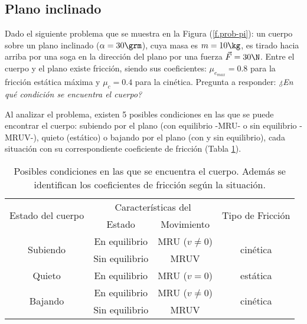 \subsection{Plano inclinado}
\label{c.pi}

Dado el siguiente problema que se muestra en la Figura (\ref{f.prob-pi}): un cuerpo
sobre un plano inclinado ($\alpha=30\grm$), cuya masa es $m=10\kg$, es tirado hacia
arriba por una soga en la dirección del plano por una fuerza $\vec{F}=30\N$.
Entre el cuerpo y el plano existe fricción, siendo sus coeficientes:
$\mu_{e_{max}}=0.8$ para la fricción estática máxima y $\mu_{c}=0.4$ para la
cinética. Pregunta a responder: \emph{¿En qué condición se encuentra el cuerpo?}

\begin{figure}[!ht]
  
\end{figure}

Al analizar el problema, existen 5 posibles condiciones en las que se puede
encontrar el cuerpo: subiendo por el plano (con equilibrio -MRU- o sin
equilibrio -MRUV-), quieto (estático) o bajando por el plano (con y sin
equilibrio), cada situación con su correspondiente coeficiente de fricción
(Tabla \ref{t.condicionpi}).

\begin{table}[!ht]
  \centering
\begin{tabular}{c|c|c|c}
  \hline\hline
  \multirow{2}{*}{Estado del cuerpo} & \multicolumn{2}{|c|}{Características del}
  & \multirow{2}{*}{Tipo de Fricción} \\ \cline{2-3}
  & Estado & Movimiento &\\
  \hline
  \multirow{2}{*}{Subiendo} & En equilibrio & MRU ($v\neq0$) &
  \multirow{2}{*}{cinética} \\
  & Sin equilibrio & MRUV \\
  \hline
  Quieto & En equilibrio & MRU ($v=0$) & estática \\
  \hline 
  \multirow{2}{*}{Bajando} & En equilibrio & MRU ($v\neq0$) &
  \multirow{2}{*}{cinética} \\
  & Sin equilibrio & MRUV \\
  \hline\hline
\end{tabular}
  \caption{Posibles condiciones en las que se encuentra el cuerpo. Además se
  identifican los coeficientes de fricción según la situación.}
  \label{t.condicionpi}
\end{table}

